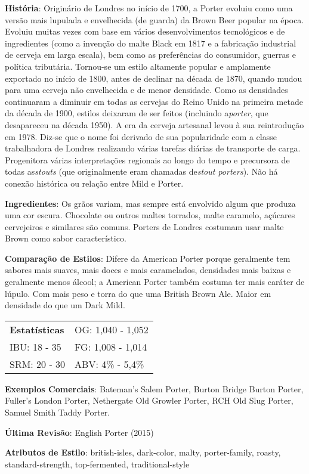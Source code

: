 \textbf{História}: Originário de Londres no início de 1700, a Porter evoluiu como uma versão mais lupulada e envelhecida (de guarda) da Brown Beer popular na época. Evoluiu muitas vezes com base em vários desenvolvimentos tecnológicos e de ingredientes (como a invenção do malte Black em 1817 e a fabricação industrial de cerveja em larga escala), bem como as preferências do consumidor, guerras e política tributária. Tornou-se um estilo altamente popular e amplamente exportado no início de 1800, antes de declinar na década de 1870, quando mudou para uma cerveja não envelhecida e de menor densidade. Como as densidades continuaram a diminuir em todas as cervejas do Reino Unido na primeira metade da década de 1900, estilos deixaram de ser feitos (incluindo a\textit{porter}, que desapareceu na década 1950). A era da cerveja artesanal levou à sua reintrodução em 1978. Diz-se que o nome foi derivado de sua popularidade com a classe trabalhadora de Londres realizando várias tarefas diárias de transporte de carga. Progenitora várias interpretações regionais ao longo do tempo e precursora de todas as\textit{stouts} (que originalmente eram chamadas de\textit{stout porters}). Não há conexão histórica ou relação entre Mild e Porter.

\textbf{Ingredientes}: Os grãos variam, mas sempre está envolvido algum que produza uma cor escura. Chocolate ou outros maltes torrados, malte caramelo, açúcares cervejeiros e similares são comuns. Porters de Londres costumam usar malte Brown como sabor característico.

\textbf{Comparação de Estilos}: Difere da American Porter porque geralmente tem sabores mais suaves, mais doces e mais caramelados, densidades mais baixas e geralmente menos álcool; a American Porter também costuma ter mais caráter de lúpulo. Com mais peso e torra do que uma British Brown Ale. Maior em densidade do que um Dark Mild.

\begin{tabular}{@{}p{35mm}p{35mm}@{}}
  \textbf{Estatísticas} & OG: 1,040 - 1,052 \\
  IBU: 18 - 35  & FG: 1,008 - 1,014  \\
  SRM: 20 - 30  & ABV: 4\% - 5,4\%
\end{tabular}

\textbf{Exemplos Comerciais}: Bateman’s Salem Porter, Burton Bridge Burton Porter, Fuller's London Porter, Nethergate Old Growler Porter, RCH Old Slug Porter, Samuel Smith Taddy Porter.

\textbf{Última Revisão}: English Porter (2015)

\textbf{Atributos de Estilo}: british-isles, dark-color, malty, porter-family, roasty, standard-strength, top-fermented, traditional-style
